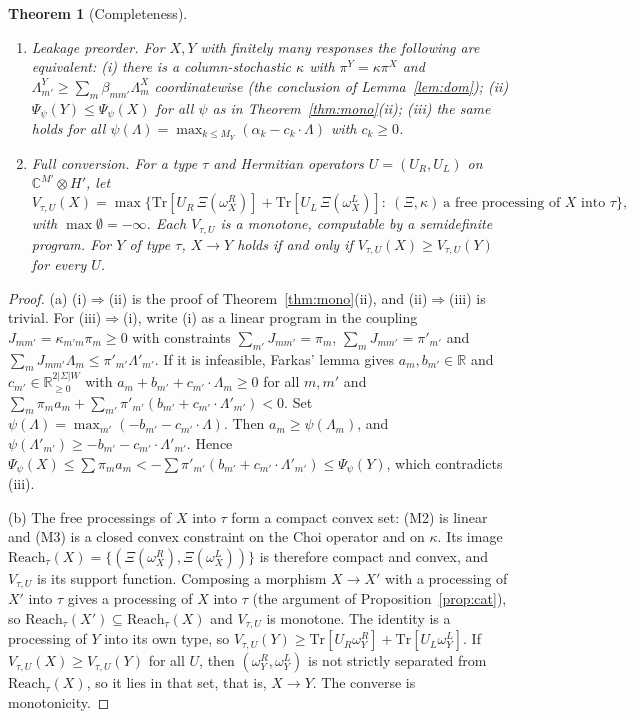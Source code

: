 \documentclass[11pt]{article}
\newtheorem{theorem}{Theorem}
\theoremstyle{definition}
\theoremstyle{remark}
\newcommand{\Tr}{\mathrm{Tr}}
\begin{document}
\begin{theorem}[Completeness]\label{thm:complete}
\leavevmode
\begin{enumerate}
\item[(a)] \emph{Leakage preorder.} For $X,Y$ with finitely many responses the following are equivalent:
(i) there is a column-stochastic $\kappa$ with $\pi^Y=\kappa\pi^X$ and $\Lambda^Y_{m'}\ge\sum_m\beta_{mm'}\Lambda^X_m$ coordinatewise (the conclusion of Lemma~\ref{lem:dom});
(ii) $\Psi_\psi(Y)\le\Psi_\psi(X)$ for all $\psi$ as in Theorem~\ref{thm:mono}(ii);
(iii) the same holds for all $\psi(\Lambda)=\max_{k\le M_Y}(\alpha_k-c_k\cdot\Lambda)$ with $c_k\ge0$.
\item[(b)] \emph{Full conversion.} For a type $\tau$ and Hermitian operators $U=(U_R,U_L)$ on $\mathbb C^{M'}\otimes H'$, let
\[
V_{\tau,U}(X)=\max\bigl\{\Tr[U_R\,\Xi(\omega^R_X)]+\Tr[U_L\,\Xi(\omega^L_X)]:\ (\Xi,\kappa)\ \text{a free processing of $X$ into $\tau$}\bigr\},
\]
with $\max\emptyset=-\infty$. Each $V_{\tau,U}$ is a monotone, computable by a semidefinite program. For $Y$ of type $\tau$, $X\to Y$ holds if and only if $V_{\tau,U}(X)\ge V_{\tau,U}(Y)$ for every $U$.
\end{enumerate}
\end{theorem}
\begin{proof}
(a) (i)$\Rightarrow$(ii) is the proof of Theorem~\ref{thm:mono}(ii), and (ii)$\Rightarrow$(iii) is trivial. For (iii)$\Rightarrow$(i), write (i) as a linear program in the coupling $J_{mm'}=\kappa_{m'm}\pi_m\ge0$ with constraints $\sum_{m'}J_{mm'}=\pi_m$, $\sum_mJ_{mm'}=\pi'_{m'}$ and $\sum_mJ_{mm'}\Lambda_m\le\pi'_{m'}\Lambda'_{m'}$. If it is infeasible, Farkas' lemma \cite{Sch86} gives $a_m,b_{m'}\in\mathbb R$ and $c_{m'}\in\mathbb R^{2|\Sigma|W}_{\ge0}$ with $a_m+b_{m'}+c_{m'}\cdot\Lambda_m\ge0$ for all $m,m'$ and $\sum_m\pi_ma_m+\sum_{m'}\pi'_{m'}(b_{m'}+c_{m'}\cdot\Lambda'_{m'})<0$. Set $\psi(\Lambda)=\max_{m'}(-b_{m'}-c_{m'}\cdot\Lambda)$. Then $a_m\ge\psi(\Lambda_m)$, and $\psi(\Lambda'_{m'})\ge-b_{m'}-c_{m'}\cdot\Lambda'_{m'}$. Hence $\Psi_\psi(X)\le\sum\pi_ma_m<-\sum\pi'_{m'}(b_{m'}+c_{m'}\cdot\Lambda'_{m'})\le\Psi_\psi(Y)$, which contradicts (iii).

(b) The free processings of $X$ into $\tau$ form a compact convex set: (M2) is linear and (M3) is a closed convex constraint on the Choi operator and on $\kappa$. Its image $\mathrm{Reach}_\tau(X)=\{(\Xi(\omega^R_X),\Xi(\omega^L_X))\}$ is therefore compact and convex, and $V_{\tau,U}$ is its support function. Composing a morphism $X\to X'$ with a processing of $X'$ into $\tau$ gives a processing of $X$ into $\tau$ (the argument of Proposition~\ref{prop:cat}), so $\mathrm{Reach}_\tau(X')\subseteq\mathrm{Reach}_\tau(X)$ and $V_{\tau,U}$ is monotone. The identity is a processing of $Y$ into its own type, so $V_{\tau,U}(Y)\ge\Tr[U_R\omega^R_Y]+\Tr[U_L\omega^L_Y]$. If $V_{\tau,U}(X)\ge V_{\tau,U}(Y)$ for all $U$, then $(\omega^R_Y,\omega^L_Y)$ is not strictly separated from $\mathrm{Reach}_\tau(X)$, so it lies in that set, that is, $X\to Y$. The converse is monotonicity.
\end{proof}
\end{document}
